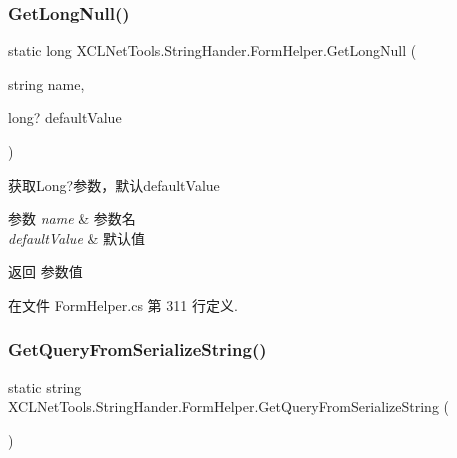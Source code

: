 \subsubsection{\texorpdfstring{Get\+Long\+Null()}{GetLongNull()}\hspace{0.1cm}{\footnotesize\ttfamily [2/2]}}
{\footnotesize\ttfamily static long X\+C\+L\+Net\+Tools.\+String\+Hander.\+Form\+Helper.\+Get\+Long\+Null (\begin{DoxyParamCaption}\item[{string}]{name,  }\item[{long?}]{default\+Value }\end{DoxyParamCaption})\hspace{0.3cm}{\ttfamily [static]}}



获取\+Long?参数，默认default\+Value 


\begin{DoxyParams}{参数}
{\em name} & 参数名\\
\hline
{\em default\+Value} & 默认值\\
\hline
\end{DoxyParams}
\begin{DoxyReturn}{返回}
参数值
\end{DoxyReturn}


在文件 Form\+Helper.\+cs 第 311 行定义.

\mbox{\label{class_x_c_l_net_tools_1_1_string_hander_1_1_form_helper_a9c3363c3f41771f044634f9e8050dc55}} 
\subsubsection{\texorpdfstring{Get\+Query\+From\+Serialize\+String()}{GetQueryFromSerializeString()}}
{\footnotesize\ttfamily static string X\+C\+L\+Net\+Tools.\+String\+Hander.\+Form\+Helper.\+Get\+Query\+From\+Serialize\+String (\begin{DoxyParamCaption}{ }\end{DoxyParamCaption})\hspace{0.3cm}{\ttfamily [static]}}




